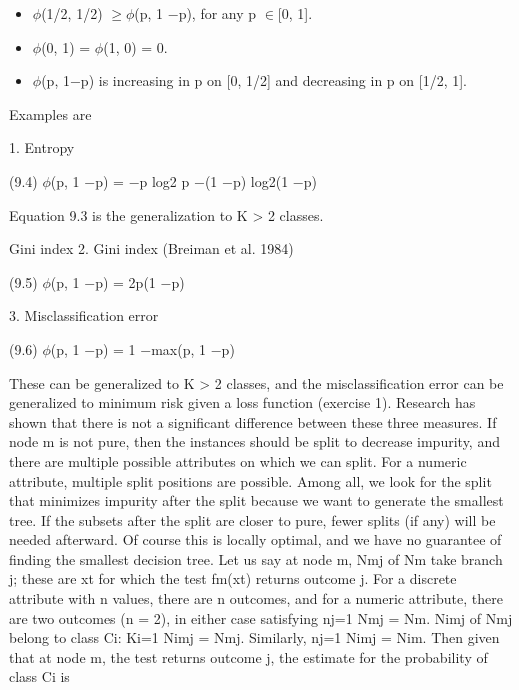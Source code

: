 \begin{itemize}
\item $\phi$(1/2, 1/2) $\geq$$\phi$(p, 1 $-$p), for any p $\in$[0, 1].
\end{itemize}

\begin{itemize}
\item $\phi$(0, 1) = $\phi$(1, 0) = 0.
\end{itemize}

\begin{itemize}
\item $\phi$(p, 1$-$p) is increasing in p on [0, 1/2] and decreasing in p on [1/2, 1].
\end{itemize}

Examples are

1. Entropy

(9.4) $\phi$(p, 1 $-$p) = $-$p log2 p $-$(1 $-$p) log2(1 $-$p)

Equation 9.3 is the generalization to K > 2 classes.

Gini index 2. Gini index (Breiman et al. 1984)

(9.5) $\phi$(p, 1 $-$p) = 2p(1 $-$p)

3. Misclassification error

(9.6) $\phi$(p, 1 $-$p) = 1 $-$max(p, 1 $-$p)

These can be generalized to K > 2 classes, and the misclassification error can be generalized to minimum risk given a loss function (exercise 1). Research has shown that there is not a significant difference between these three measures. If node m is not pure, then the instances should be split to decrease impurity, and there are multiple possible attributes on which we can split. For a numeric attribute, multiple split positions are possible. Among all, we look for the split that minimizes impurity after the split because we want to generate the smallest tree. If the subsets after the split are closer to pure, fewer splits (if any) will be needed afterward. Of course this is locally optimal, and we have no guarantee of finding the smallest decision tree. Let us say at node m, Nmj of Nm take branch j; these are xt for which the test fm(xt) returns outcome j. For a discrete attribute with n values, there are n outcomes, and for a numeric attribute, there are two outcomes (n = 2), in either case satisfying nj=1 Nmj = Nm. Nimj of Nmj belong to class Ci: Ki=1 Nimj = Nmj. Similarly, nj=1 Nimj = Nim. Then given that at node m, the test returns outcome j, the estimate for the probability of class Ci is

